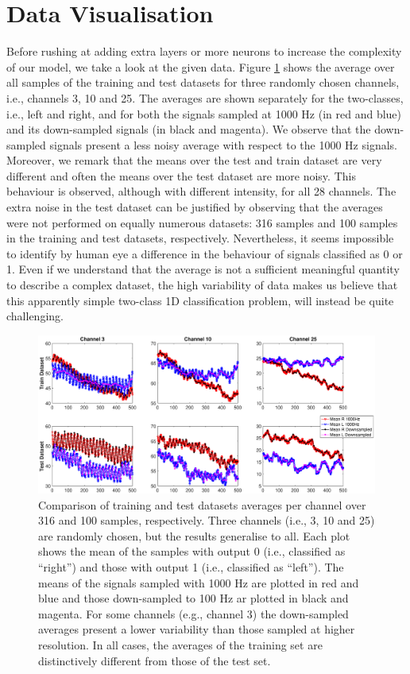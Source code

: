 \documentclass{article}
\begin{document}
 \section{Data Visualisation}\label{sec_visual}
 Before rushing at adding extra layers or more neurons to increase the complexity of our model, we  take a look at the given data. 
 Figure \ref{fig_mean_1000hz_vs_downsampled} shows the average over all samples of the training and test datasets for three randomly chosen channels, i.e., channels 3, 10 and 25. 
The averages are shown separately for the two-classes, i.e., left and right, and for both the signals sampled at 1000 Hz (in red and blue) and its down-sampled signals (in black and magenta). 
We  observe that the down-sampled signals present a less noisy average with respect to the 1000 Hz signals. 
Moreover, we remark that  the means over the test and train dataset are very different and often the means over the test dataset are more noisy. 
This behaviour is observed, although with different intensity, for all 28 channels. 
The extra noise in the test dataset can be justified by observing that the averages were not performed on equally numerous datasets: 316 samples and 100 samples in the training and test datasets, respectively. 
Nevertheless, it seems impossible to identify by human eye a difference in the behaviour of signals classified as 0 or 1. 
Even if we understand that the average is not a sufficient meaningful quantity to describe a complex dataset, the high variability of data makes us believe that this apparently simple two-class 1D classification problem, will instead be quite challenging.  
 \begin{figure}[h]
 \begin{center}
  \includegraphics[width=1\textwidth]{fig/fig4new_mean_downsampled_vs1000} 
  \caption{Comparison of training and test datasets averages per channel over 316 and 100 samples, respectively.  
  Three channels (i.e., 3, 10 and 25) are randomly chosen, but the results generalise to all. 
  Each plot shows the mean of the samples with output 0 (i.e., classified as ``right'') and those with output 1 (i.e., classified as ``left''). 
  The means of the signals sampled with 1000 Hz are plotted in red and blue and those down-sampled to 100 Hz ar plotted in black and magenta. 
For some channels (e.g., channel 3) the down-sampled averages present a lower variability than those sampled at higher resolution. 
  In all cases, the averages of the training set are distinctively different from those of the test set. 
  \label{fig_mean_1000hz_vs_downsampled}}
  \end{center}
  \end{figure}
\end{document}
